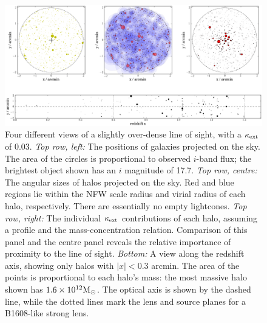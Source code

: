 \documentclass[useAMS,usenatbib,a4paper]{mn2e}
\begin{document}
\begin{figure}
\includegraphics[width=\textwidth]{figs/viewofalightcone.eps}
\caption[magcut]{Four different views of a slightly over-dense \MS line
of sight, with a $\kappa_{\rm ext}$ of 0.03. 
{\it Top row, left:} The positions of galaxies projected on the sky. The area
of the circles is proportional to observed $i$-band flux; the brightest
object shown has an $i$ magnitude of 17.7. 
{\it Top row, centre:} The angular sizes of halos projected on the sky.
Red and blue regions lie within the NFW scale radius and virial radius
of each halo, respectively. There are essentially no empty lightcones. 
{\it Top row, right:} The individual $\kappa_{\rm ext}$ contributions of
each halo, assuming a \citet{BMO} profile and the \citet{Neto2007}
mass-concentration relation. Comparison of
this panel and the centre panel reveals the relative importance of
proximity to the line of sight.
{\it Bottom:} A view along the redshift axis, showing only halos with
$|x|<0.3$ arcmin. The area of the points is proportional to each halo's
mass: the most massive halo shown has $1.6\times10^{12}\Msun$. The
optical axis is shown by the dashed line, while the dotted lines mark
the lens and source planes for a B1608-like strong lens.}
\label{fig:lightcone}
\end{figure}



\end{document}
